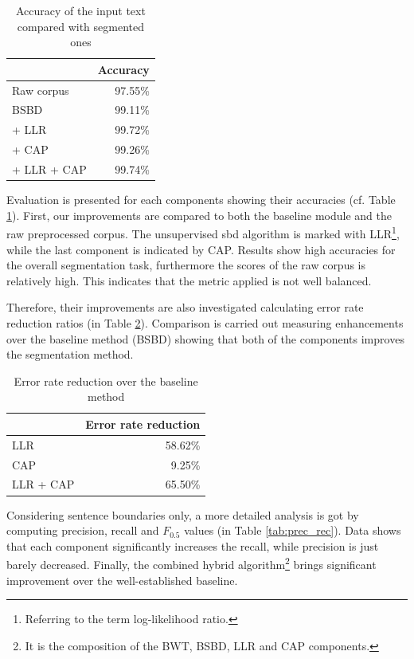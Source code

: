 \begin{table}[H]
\centering
\caption{Accuracy of the input text compared with segmented ones}
\label{tab:base}
\begin{tabular}{ l  r } 
\hline
& Accuracy \\ 
\hline
Raw corpus  & 97.55\% \\
BSBD & 99.11\% \\
\hspace{0.2cm}+ LLR & 99.72\% \\
\hspace{0.2cm}+ CAP & 99.26\% \\
\hspace{0.2cm}+ LLR + CAP & 99.74\% \\
\hline
\end{tabular}
\end{table}

Evaluation is presented for each components showing their accuracies (cf. Table \ref{tab:base}).
First, our improvements are compared to both the baseline module and the raw preprocessed corpus.
The unsupervised \acrshort{sbd} algorithm is marked with LLR\footnote{Referring to the term log-likelihood ratio.}, while the last component is indicated by CAP.
Results show high accuracies for the overall segmentation task, furthermore the scores of the raw corpus is relatively high.
This indicates that the metric applied is not well balanced.

Therefore, their improvements are also investigated calculating error rate reduction ratios (in Table \ref{tab:reduction}). 
Comparison is carried out measuring enhancements over the baseline method (BSBD) showing that both of the components improves the segmentation method.

\begin{table}[H]
\centering
\caption{Error rate reduction over the baseline method}
\label{tab:reduction}
\begin{tabular}{ l  r } 
\hline
& Error rate reduction\\
\hline
LLR & 58.62\% \\
CAP & 9.25\% \\
LLR + CAP & 65.50\% \\
\hline
\end{tabular}
\end{table}

Considering sentence boundaries only, a more detailed analysis is got by computing precision, recall and $F_{0.5}$ values (in Table \ref{tab:prec_rec}). 
Data shows that each component significantly increases the recall, while precision is just barely decreased. 
Finally, the combined hybrid algorithm\footnote{It is the composition of the BWT, BSBD, LLR and CAP components.} brings significant improvement over the well-established baseline.

